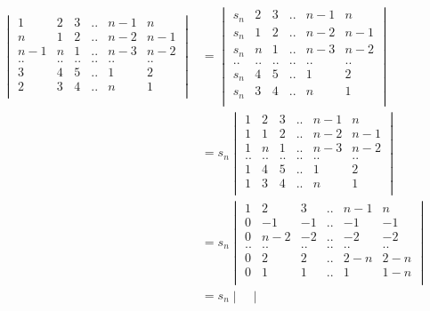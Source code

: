 \documentclass[12pt,a4paper]{ctexart}
\begin{document}
\begin{align*}
    \begin{vmatrix}
        1 & 2 & 3 & .. & n-1 & n \\
        n & 1 & 2 & .. & n-2 & n-1  \\
        n- 1& n & 1 & ..  & n-3 & n-2  \\
        .. & .. & .. & .. & .. & .. \\
        3 & 4 & 5 & .. & 1 & 2 \\
        2 & 3 & 4 & .. & n & 1  \\
   \end{vmatrix} &=     \begin{vmatrix}
        s_n & 2 & 3 & .. & n-1 & n \\
        s_n & 1 & 2 & .. & n-2 & n-1  \\
        s_n & n & 1 & ..  & n-3 & n-2  \\
        .. & .. & .. & .. & .. & .. \\
        s_n & 4 & 5 & .. & 1 & 2 \\
        s_n & 3 & 4 & .. & n & 1  \\
    \end{vmatrix} \\
    &=  s_n \begin{vmatrix}
        1 & 2 & 3 & .. & n-1 & n \\
        1 & 1 & 2 & .. & n-2 & n-1  \\
        1 & n & 1 & ..  & n-3 & n-2  \\
        .. & .. & .. & .. & .. & .. \\
        1 & 4 & 5 & .. & 1 & 2 \\
        1 & 3 & 4 & .. & n & 1  \\
    \end{vmatrix} \\
     &=  s_n \begin{vmatrix}
        1 & 2 & 3 & .. & n-1 & n \\
        0 & -1 & -1 & .. & -1 & -1  \\
        0 & n-2 & -2 & ..  & -2 & -2  \\
        .. & .. & .. & .. & .. & .. \\
        0 & 2 & 2 & .. & 2-n & 2-n \\
        0 & 1 & 1 & .. & 1 & 1-n  \\
    \end{vmatrix}  \\
    &= s_n \begin{vmatrix}

\end{vmatrix}
\end{align*}
\end{document}

